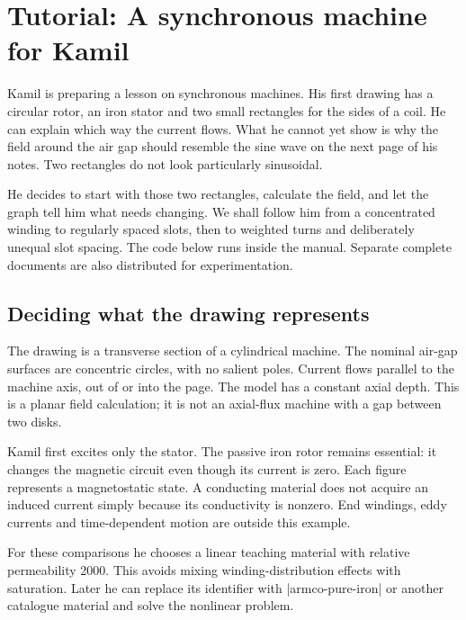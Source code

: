 \clearpage
\section{Tutorial: A synchronous machine for Kamil}
\label{sec:tutorial-machines}

Kamil is preparing a lesson on synchronous machines. His first drawing has a
circular rotor, an iron stator and two small rectangles for the sides of a
coil. He can explain which way the current flows. What he cannot yet show is
why the field around the air gap should resemble the sine wave on the next
page of his notes. Two rectangles do not look particularly sinusoidal.

He decides to start with those two rectangles, calculate the field, and let
the graph tell him what needs changing. We shall follow him from a concentrated
winding to regularly spaced slots, then to weighted turns and deliberately
unequal slot spacing. The code below runs inside the manual. Separate complete documents are
also distributed for experimentation.

\subsection{Deciding what the drawing represents}

The drawing is a transverse section of a cylindrical machine. The nominal
air-gap surfaces are concentric circles, with no salient poles. Current flows
parallel to the machine axis, out of or into the page. The model has a constant
axial depth. This is a planar field calculation; it is not an axial-flux
machine with a gap between two disks.

Kamil first excites only the stator. The passive iron rotor remains essential:
it changes the magnetic circuit even though its current is zero. Each figure
represents a magnetostatic state. A conducting material does not acquire an
induced current simply because its conductivity is nonzero. End windings,
eddy currents and time-dependent motion are outside this example.

For these comparisons he chooses a linear teaching material with relative
permeability 2000. This avoids mixing winding-distribution effects with
saturation. Later he can replace its identifier with |armco-pure-iron| or another
catalogue material and solve the nonlinear problem.

